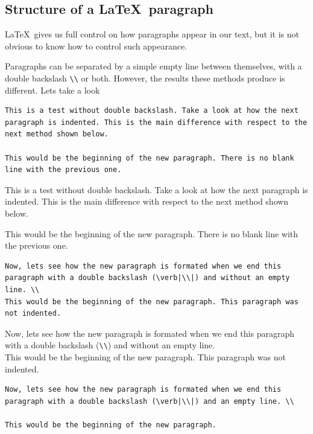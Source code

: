 \subsection{Structure of a \LaTeX\ paragraph}

\LaTeX\ gives us full control on how paragraphs appear in our text, but it is not obvious to know how to control such appearance.

Paragraphs can be separated by a simple empty line between themselves, with a double backslash \verb|\\| or both. However, the results these methods produce is different. Lets take a look

\begin{lstlisting}[language={[LaTeX]TeX}]
This is a test without double backslash. Take a look at how the next paragraph is indented. This is the main difference with respect to the next method shown below.

This would be the beginning of the new paragraph. There is no blank line with the previous one.
\end{lstlisting}

This is a test without double backslash. Take a look at how the next paragraph is indented. This is the main difference with respect to the next method shown below.

This would be the beginning of the new paragraph. There is no blank line with the previous one.

\begin{lstlisting}[language={[LaTeX]TeX}]
Now, lets see how the new paragraph is formated when we end this paragraph with a double backslash (\verb|\\|) and without an empty line. \\
This would be the beginning of the new paragraph. This paragraph was not indented.
\end{lstlisting}

Now, lets see how the new paragraph is formated when we end this paragraph with a double backslash (\verb|\\|) and without an empty line. \\
This would be the beginning of the new paragraph. This paragraph was not indented.

\begin{lstlisting}[language={[LaTeX]TeX}]
Now, lets see how the new paragraph is formated when we end this paragraph with a double backslash (\verb|\\|) and an empty line. \\

This would be the beginning of the new paragraph.
\end{lstlisting}


